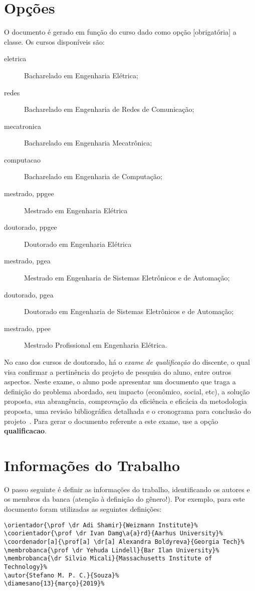 \section{Opções}
O documento é gerado em função do curso dado como opção [obrigatória] a classe. Os cursos 
disponíveis são:
\begin{description}
	\item[eletrica] Bacharelado em Engenharia Elétrica;
	\item[redes] Bacharelado em Engenharia de Redes de Comunicação;
	\item[mecatronica] Bacharelado em Engenharia Mecatrônica;
	\item[computacao] Bacharelado em Engenharia de Computação;
	\item[mestrado, ppgee] Mestrado em Engenharia Elétrica
	\item[doutorado, ppgee] Doutorado em Engenharia Elétrica
	\item[mestrado, pgea] Mestrado em Engenharia de Sistemas Eletrônicos e de Automação;
	\item[doutorado, pgea] Doutorado em Engenharia de Sistemas Eletrônicos e de Automação;
	\item[mestrado, ppee] Mestrado Profissional em Engenharia Elétrica.
\end{description}

No caso dos cursos de doutorado, há o \emph{exame de qualificação} do discente, o qual visa 
confirmar a pertinência do projeto de pesquisa do aluno, entre outros aspectos. Neste exame, o
aluno pode apresentar um documento que traga a definição do problema abordado, seu impacto 
(econômico, social, etc), a solução proposta, sua abrangência, comprovação da eficiência e eficácia
da metodologia proposta, uma revisão bibliográfica detalhada e o cronograma para conclusão do 
projeto~\cite{ppginf}. Para gerar o documento referente a este exame, use a opção
\textbf{qualificacao}.

\section{Informações do Trabalho}%
O passo seguinte é definir as informações do trabalho, identificando os autores e os membros da 
banca (atenção à definição do gênero!). Por exemplo, para este documento foram utilizadas as 
seguintes definições:

\begin{verbatim}
\orientador{\prof \dr Adi Shamir}{Weizmann Institute}%
\coorientador{\prof \dr Ivan Damg\a{a}rd}{Aarhus University}%
\coordenador[a]{\prof[a] \dr[a] Alexandra Boldyreva}{Georgia Tech}%
\membrobanca{\prof \dr Yehuda Lindell}{Bar Ilan University}%
\membrobanca{\dr Silvio Micali}{Massachusetts Institute of Technology}%
\autor{Stefano M. P. C.}{Souza}%
\diamesano{13}{março}{2019}%
\end{verbatim}

